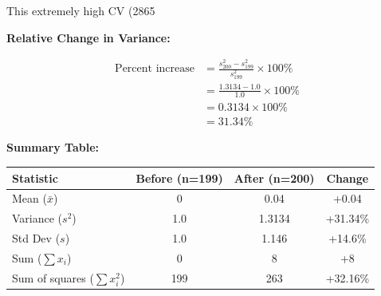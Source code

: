 \documentclass[12pt]{article}
\begin{document}
\begin{solution}
This extremely high CV (2865%

\textbf{Relative Change in Variance:}

\begin{align*}
\text{Percent increase} &= \frac{s_{200}^2 - s_{199}^2}{s_{199}^2} \times 100\% \\
&= \frac{1.3134 - 1.0}{1.0} \times 100\% \\
&= 0.3134 \times 100\% \\
&= 31.34\%
\end{align*}

\textbf{Summary Table:}

\begin{center}
\begin{tabular}{|l|c|c|c|}
\hline
\textbf{Statistic} & \textbf{Before (n=199)} & \textbf{After (n=200)} & \textbf{Change} \\
\hline
Mean (\(\bar{x}\)) & 0 & 0.04 & +0.04 \\
Variance (\(s^2\)) & 1.0 & 1.3134 & +31.34\% \\
Std Dev (\(s\)) & 1.0 & 1.146 & +14.6\% \\
Sum (\(\sum x_i\)) & 0 & 8 & +8 \\
Sum of squares (\(\sum x_i^2\)) & 199 & 263 & +32.16\% \\
\hline
\end{tabular}
\end{center}
\end{solution}
\end{document}
